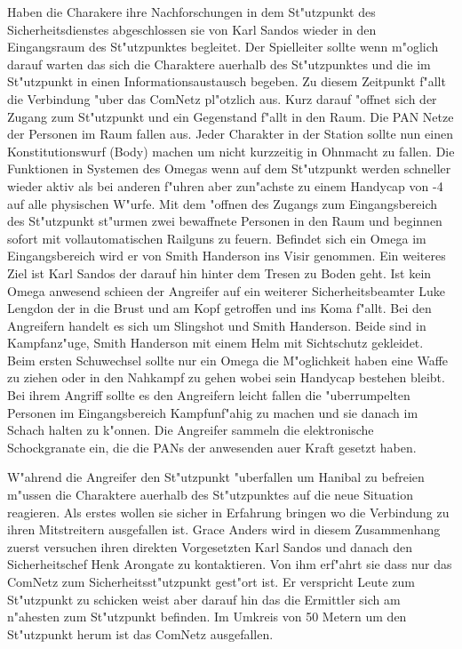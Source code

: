 
Haben die Charakere ihre Nachforschungen in dem St"utzpunkt des Sicherheitsdienstes abgeschlossen sie von Karl Sandos wieder in den Eingangsraum des St"utzpunktes begleitet. Der Spielleiter sollte wenn m"oglich darauf warten das sich die Charaktere au\3erhalb des St"utzpunktes und die im St"utzpunkt in einen Informationsaustausch begeben. Zu diesem Zeitpunkt f"allt die Verbindung "uber das ComNetz pl"otzlich aus. Kurz darauf "offnet sich der Zugang zum St"utzpunkt und ein Gegenstand f"allt in den Raum. Die PAN Netze der Personen im Raum fallen aus. Jeder Charakter in der Station sollte nun einen Konstitutionswurf (Body) machen um nicht kurzzeitig in Ohnmacht zu fallen. Die Funktionen in Systemen des Omegas wenn auf dem St"utzpunkt werden schneller wieder aktiv als bei anderen f"uhren aber zun"achste zu einem Handycap von -4 auf alle physischen W"urfe. Mit dem "offnen des Zugangs zum Eingangsbereich des St"utzpunkt st"urmen zwei bewaffnete Personen in den Raum und beginnen sofort mit vollautomatischen Railguns zu feuern. Befindet sich ein Omega im Eingangsbereich wird er von
Smith Handerson ins Visir genommen. Ein weiteres Ziel ist Karl Sandos der darauf hin hinter dem Tresen zu Boden geht. Ist kein Omega anwesend schie\3en der Angreifer auf ein weiterer Sicherheitsbeamter Luke Lengdon der in die Brust und am Kopf getroffen und ins Koma f"allt. Bei den Angreifern handelt es sich um Slingshot und Smith Handerson. Beide sind in Kampfanz"uge, Smith Handerson mit einem Helm mit Sichtschutz gekleidet. Beim ersten Schu\3wechsel sollte nur ein Omega die M"oglichkeit haben eine Waffe zu ziehen oder in den Nahkampf zu gehen wobei sein Handycap bestehen bleibt. Bei ihrem Angriff sollte es den Angreifern leicht fallen die "uberrumpelten Personen im Eingangsbereich Kampfunf"ahig zu machen und sie danach im Schach halten zu k"onnen. Die Angreifer sammeln die elektronische Schockgranate ein, die die PANs der anwesenden au\3er Kraft gesetzt haben.

W"ahrend die Angreifer den St"utzpunkt "uberfallen um Hanibal zu befreien m"ussen die Charaktere au\3erhalb des St"utzpunktes auf die neue Situation reagieren. Als erstes wollen sie sicher in Erfahrung bringen wo die Verbindung zu ihren Mitstreitern ausgefallen ist. Grace Anders wird in diesem Zusammenhang zuerst versuchen ihren direkten Vorgesetzten Karl Sandos und danach den Sicherheitschef Henk Arongate zu kontaktieren. Von ihm erf"ahrt sie dass nur das ComNetz zum Sicherheitsst"utzpunkt gest"ort ist. Er verspricht Leute zum St"utzpunkt zu schicken weist aber darauf hin das die Ermittler sich am n"ahesten zum St"utzpunkt befinden. Im Umkreis von 50 Metern um den St"utzpunkt herum ist das ComNetz ausgefallen. 

